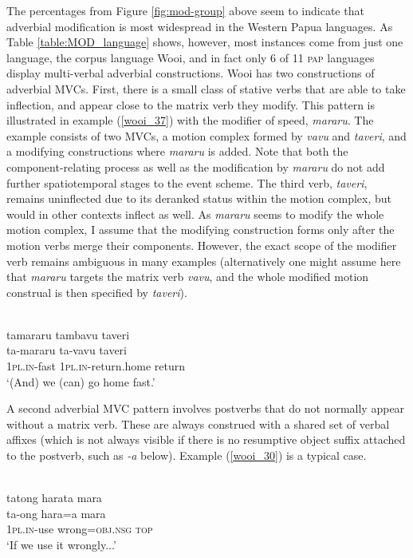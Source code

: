 The percentages from Figure \ref{fig:mod-group} above seem to indicate that adverbial modification is most widespread in the Western Papua languages. As Table \ref{table:MOD_language} shows, however, most instances come from just one language, the corpus language Wooi, and in fact only 6 of 11 \textsc{pap} languages display multi-verbal adverbial constructions. Wooi has two constructions of adverbial MVCs. First, there is a small class of stative verbs that are able to take inflection, and appear close to the matrix verb they modify. This pattern is illustrated in example (\ref{wooi_37}) with the modifier of speed, \textit{mararu}. The example consists of two MVCs, a motion complex formed by \textit{vavu} and \textit{taveri}, and a modifying constructions where \textit{mararu} is added. Note that both the component-relating process as well as the modification by \textit{mararu} do not add further spatiotemporal stages to the event scheme. The third verb, \textit{taveri}, remains uninflected due to its deranked status within the motion complex, but would in other contexts inflect as well. As \textit{mararu} seems to modify the whole motion complex, I assume that the modifying construction forms only after the motion verbs merge their components. However, the exact scope of the modifier verb remains ambiguous in many examples (alternatively one might assume here that \textit{mararu} targets the matrix verb \textit{vavu}, and the whole modified motion construal is then specified by \textit{taveri}).

\ea \label{wooi_37}
\\
\glll tamararu tambavu taveri \\
ta-mararu ta-vavu taveri \\
1\textsc{pl}.\textsc{in}-fast 1\textsc{pl}.\textsc{in}-return.home return \\
\glft `(And) we (can) go home fast.'\\ 
\z

A second adverbial MVC pattern involves postverbs that do not normally appear without a matrix verb. These are always construed with a shared set of verbal affixes (which is not always visible if there is no resumptive object suffix attached to the postverb, such as \textit{-a} below). Example (\ref{wooi_30}) is a typical case.

\ea \label{wooi_30}
\\
\glll tatong harata mara \\
ta-ong hara=a mara \\
1\textsc{pl}.\textsc{in}-use wrong=\textsc{obj}.\textsc{nsg} \textsc{top} \\
\glft `If we use it wrongly...'\\ 
\z

